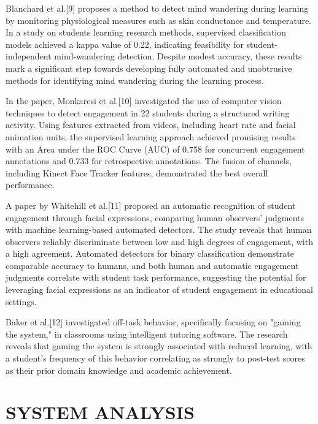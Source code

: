 \par Blanchard et al.[9] proposes a method to detect mind wandering during learning by monitoring physiological measures such as skin conductance and temperature. In a study on students learning research methods, supervised classification models achieved a kappa value of 0.22, indicating feasibility for student-independent mind-wandering detection. Despite modest accuracy, these results mark a significant step towards developing fully automated and unobtrusive methods for identifying mind wandering during the learning process.
\par In the paper, Monkaresi et al.[10] investigated the use of computer vision techniques to detect engagement in 22 students during a structured writing activity. Using features extracted from videos, including heart rate and facial animation units, the supervised learning approach achieved promising results with an Area under the ROC Curve (AUC) of 0.758 for concurrent engagement annotations and 0.733 for retrospective annotations. The fusion of channels, including Kinect Face Tracker features, demonstrated the best overall performance.
\par A paper by Whitehill et al.[11] proposed an automatic recognition of student engagement through facial expressions, comparing human observers' judgments with machine learning-based automated detectors. The study reveals that human observers reliably discriminate between low and high degrees of engagement, with a high agreement. Automated detectors for binary classification demonstrate comparable accuracy to humans, and both human and automatic engagement judgments correlate with student task performance, suggesting the potential for leveraging facial expressions as an indicator of student engagement in educational settings.
\par Baker et al.[12] investigated off-task behavior, specifically focusing on "gaming the system," in classrooms using intelligent tutoring software. The research reveals that gaming the system is strongly associated with reduced learning, with a student's frequency of this behavior correlating as strongly to post-test scores as their prior domain knowledge and academic achievement.





\chapter[SYSTEM ANALYSIS]{\fontsize{16}{12}\vspace{-.59in}\selectfont SYSTEM ANALYSIS}
